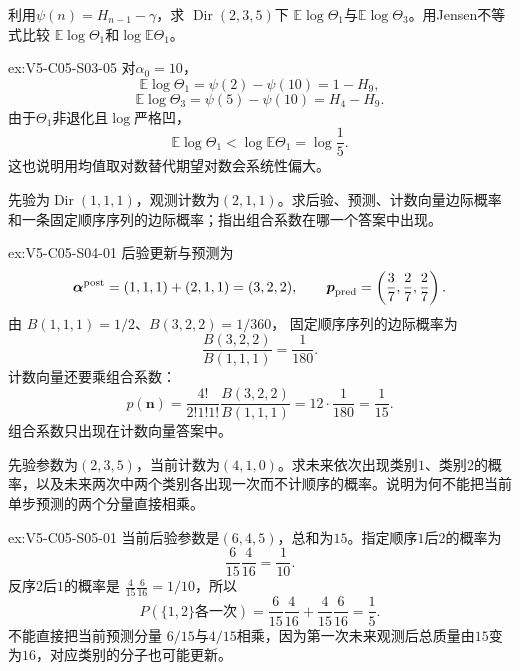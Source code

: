 \begin{SLChapterExercisePairSection}
\begin{exercise}\label{ex:V5-C05-S03-05}
利用$\psi(n)=H_{n-1}-\gamma$，求
$\operatorname{Dir}(2,3,5)$下
$\mathbb E\log\Theta_1$与$\mathbb E\log\Theta_3$。用Jensen不等式比较
$\mathbb E\log\Theta_1$和$\log\mathbb E\Theta_1$。
\end{exercise}
\ifSLFullEdition
{}\label{sol:V5-C05-S03-05}
\begin{chapterexercisesolution}{ex:V5-C05-S03-05}
\nopagebreak[4]
对$\alpha_0=10$，
\[
\mathbb E\log\Theta_1
=\psi(2)-\psi(10)=1-H_9,
\]
\[
\mathbb E\log\Theta_3
=\psi(5)-\psi(10)=H_4-H_9.
\]
由于$\Theta_1$非退化且$\log$严格凹，
\[
\mathbb E\log\Theta_1
<\log\mathbb E\Theta_1
=\log\frac15.
\]
这也说明用均值取对数替代期望对数会系统性偏大。
\end{chapterexercisesolution}
\fi

\begin{exercise}\label{ex:V5-C05-S04-01}
先验为$\operatorname{Dir}(1,1,1)$，观测计数为$(2,1,1)$。求后验、预测、计数向量边际概率和一条固定顺序序列的边际概率；指出组合系数在哪一个答案中出现。
\end{exercise}
\ifSLFullEdition
{}\label{sol:V5-C05-S04-01}
\begin{chapterexercisesolution}{ex:V5-C05-S04-01}
\nopagebreak[4]
后验更新与预测为
\[
\boldsymbol\alpha^{\rm post}=(1,1,1)+(2,1,1)=(3,2,2),
\qquad
\boldsymbol p_{\rm pred}=\left(\frac37,\frac27,\frac27\right).
\]
由
$B(1,1,1)=1/2$、$B(3,2,2)=1/360$，
固定顺序序列的边际概率为
\[
\frac{B(3,2,2)}{B(1,1,1)}=\frac1{180}.
\]
计数向量还要乘组合系数：
\[
p(\boldsymbol n)
=\frac{4!}{2!1!1!}\frac{B(3,2,2)}{B(1,1,1)}
=12\cdot\frac1{180}=\frac1{15}.
\]
组合系数只出现在计数向量答案中。
\end{chapterexercisesolution}
\fi

\begin{exercise}\label{ex:V5-C05-S05-01}
先验参数为$(2,3,5)$，当前计数为$(4,1,0)$。求未来依次出现类别$1$、类别$2$的概率，以及未来两次中两个类别各出现一次而不计顺序的概率。说明为何不能把当前单步预测的两个分量直接相乘。
\end{exercise}
\ifSLFullEdition
{}\label{sol:V5-C05-S05-01}
\begin{chapterexercisesolution}{ex:V5-C05-S05-01}
\nopagebreak[4]
当前后验参数是$(6,4,5)$，总和为$15$。指定顺序$1$后$2$的概率为
\[
\frac6{15}\frac4{16}=\frac1{10}.
\]
反序$2$后$1$的概率是
$\frac4{15}\frac6{16}=1/10$，所以
\[
P(\{1,2\}\text{各一次})
=\frac6{15}\frac4{16}
+\frac4{15}\frac6{16}
=\frac15.
\]
不能直接把当前预测分量
$6/15$与$4/15$相乘，因为第一次未来观测后总质量由$15$变为$16$，对应类别的分子也可能更新。
\end{chapterexercisesolution}
\fi


\end{SLChapterExercisePairSection}
